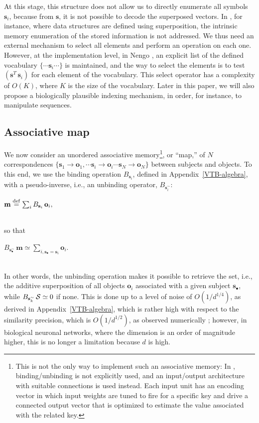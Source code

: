 \documentclass[sn-mathphys]{sn-jnl}
\newcommand{\defq}{\stackrel {\rm def}{=}}
\newcommand{\eqline}[1]{~\vspace{0.1cm}\\\centerline{$#1$}\vspace{0.1cm}\\}
\begin{document}
\begin{appendices}
At this stage, this structure does not allow us to directly enumerate all symbols $\mathbf{s}_i$, because from $\mathbf{s}$, it is not possible to decode the superposed vectors. In \cite{crawford_biologically_2016}, for instance, where data structures are defined using superposition, the intrinsic memory enumeration of the stored information is not addressed. We thus need an external mechanism to select all elements and perform an operation on each one. However, at the implementation level, in Nengo \cite{eliasmith_how_2013}, an explicit list of the defined vocabulary $\{\cdots \mathbf{s}_i \cdots\}$ is maintained, and the way to select the elements is to test $(\mathbf{s}^T \, \mathbf{s}_i)$ for each element of the vocabulary. This select operator has a complexity of $O(K)$, where $K$ is the size of the vocabulary. Later in this paper, we will also propose a biologically plausible indexing mechanism, in order, for instance, to manipulate sequences.

\subsection{Associative map}

We now consider an unordered associative memory\footnote{This is not the only way to implement such an associative memory: In \cite{voelker_learning_2014}, binding/unbinding is not explicitly used, and an input/output architecture with suitable connections is used instead. Each input unit has an encoding vector in which input weights are tuned to fire for a specific key and drive a connected output vector that is optimized to estimate the value associated with the related key.}, or ``map,'' of $N$ correspondences $\{\mathbf{s}_1 \rightarrow \mathbf{o}_1, \cdots \mathbf{s}_i \rightarrow \mathbf{o}_i \cdots \mathbf{s}_N \rightarrow \mathbf{o}_N\}$ between subjects and objects. To this end, we use the binding operation $B_{\mathbf{s}_i}$, defined in Appendix~\ref{VTB-algebra},  with a pseudo-inverse, i.e., an unbinding operator, $B_{\mathbf{s}_i^\sim}$:
\eqline{\mathbf{m} \defq \sum_i B_{\mathbf{s}_i} \, \mathbf{o}_i,}
so that
\eqline{B_{\mathbf{s}_\bullet^\sim} \, \mathbf{m} \simeq \sum_{i, \mathbf{s}_\bullet = \mathbf{s}_i} \mathbf{o}_i.}
In other words, the unbinding operation makes it possible to retrieve the set, i.e., the additive superposition of all objects $\mathbf{o}_i$ associated with a given subject $\mathbf{s}_\bullet$, while $B_{\mathbf{s}_k^\sim} \, {\cal S} \simeq 0$ if none. This is done up to a level of noise of $O(1/d^{1/4})$, as derived in Appendix~\ref{VTB-algebra}, which is rather high with respect to the similarity precision, which is $O(1/d^{1/2})$, as observed numerically \cite{schlegel_comparison_2020}; however, in biological neuronal networks, where the dimension is an order of magnitude higher, this is no longer a limitation because $d$ is high. 


\end{appendices}
\end{document}
